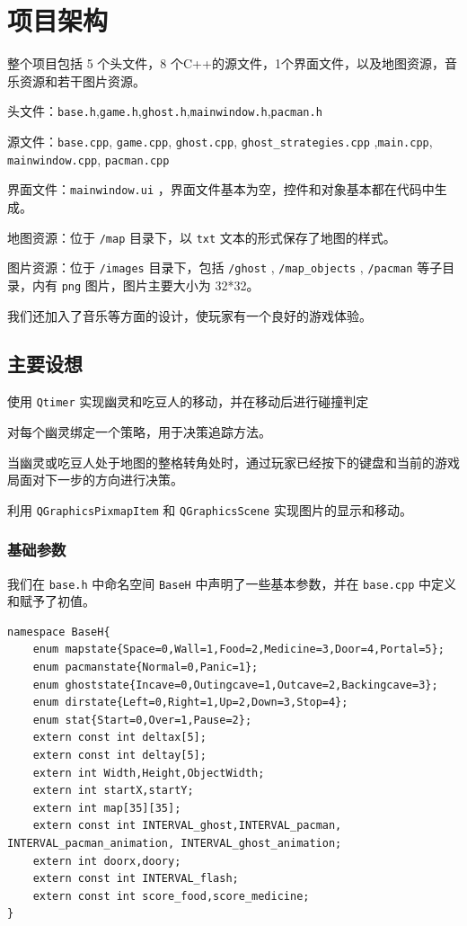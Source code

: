 \documentclass[UTF8,11pt]{ctexart}
\begin{document}
    \section{项目架构}
        整个项目包括 5 个头文件，8 个C++的源文件，1个界面文件，以及地图资源，音乐资源和若干图片资源。

        头文件：\verb|base.h|,\verb|game.h|,\verb|ghost.h|,\verb|mainwindow.h|,\verb|pacman.h|

        源文件：\verb|base.cpp|, \verb|game.cpp|, \verb|ghost.cpp|, \verb|ghost_strategies.cpp| ,\verb|main.cpp|, \verb|mainwindow.cpp|, \verb|pacman.cpp|
        
        界面文件：\verb|mainwindow.ui| ，界面文件基本为空，控件和对象基本都在代码中生成。
        
        地图资源：位于 \verb|/map| 目录下，以 \verb|txt| 文本的形式保存了地图的样式。
        
        图片资源：位于 \verb|/images| 目录下，包括 \verb|/ghost| , \verb|/map_objects| , \verb|/pacman| 等子目录，内有 \verb|png| 图片，图片主要大小为 32*32。
        
        我们还加入了音乐等方面的设计，使玩家有一个良好的游戏体验。
    \subsection{主要设想}
        使用 \verb|Qtimer| 实现幽灵和吃豆人的移动，并在移动后进行碰撞判定

	    对每个幽灵绑定一个策略，用于决策追踪方法。
        
	    当幽灵或吃豆人处于地图的整格转角处时，通过玩家已经按下的键盘和当前的游戏局面对下一步的方向进行决策。

	    利用 \verb|QGraphicsPixmapItem| 和 \verb|QGraphicsScene| 实现图片的显示和移动。
    \subsubsection*{基础参数}
	    我们在 \verb|base.h| 中命名空间 \verb|BaseH| 中声明了一些基本参数，并在 \verb|base.cpp| 中定义和赋予了初值。
        \begin{lstlisting}
namespace BaseH{
    enum mapstate{Space=0,Wall=1,Food=2,Medicine=3,Door=4,Portal=5};
    enum pacmanstate{Normal=0,Panic=1};
    enum ghoststate{Incave=0,Outingcave=1,Outcave=2,Backingcave=3};
    enum dirstate{Left=0,Right=1,Up=2,Down=3,Stop=4};
    enum stat{Start=0,Over=1,Pause=2};
    extern const int deltax[5];
    extern const int deltay[5];
    extern int Width,Height,ObjectWidth;
    extern int startX,startY;
    extern int map[35][35];
    extern const int INTERVAL_ghost,INTERVAL_pacman, INTERVAL_pacman_animation, INTERVAL_ghost_animation;
    extern int doorx,doory;
    extern const int INTERVAL_flash;
    extern const int score_food,score_medicine;
}
        \end{lstlisting}
\end{document}
